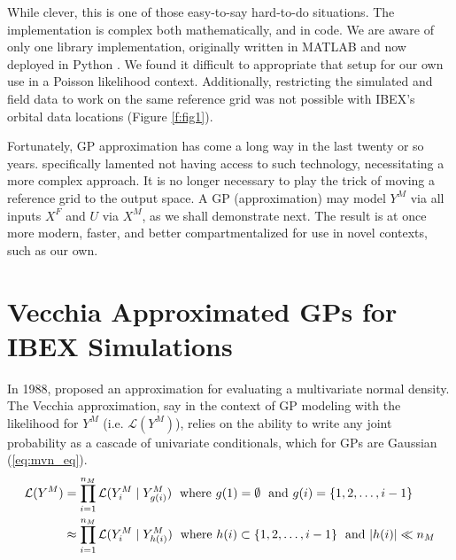 \documentclass[11pt]{article}
\begin{document}
While clever, this is one of those easy-to-say hard-to-do situations. The
implementation is complex both mathematically, and in code.  We are aware of
only one library implementation, originally written in {\sf MATLAB} and now
deployed in {\sf Python} \citep{gattiker2020lanl}.  We found it difficult to
appropriate that setup for our own use in a Poisson likelihood context.
Additionally, restricting the simulated and field data to work on the same
reference grid was not possible with IBEX's orbital data locations (Figure
\ref{f:fig1}).

Fortunately, GP approximation has come a long way in the last
twenty or so years. \citeauthor{higdoncalib2008} specifically lamented not having
access to such technology, necessitating a more complex approach. It is no
longer necessary to play the trick of moving a reference grid to the output
space.  A GP (approximation) may model $Y^M$ via all inputs $X^F$ and $U$ via
$X^M$, as we shall demonstrate next.  The result is at once more modern, faster,
and better compartmentalized for use in novel contexts, such as our own.



\section{Vecchia Approximated GPs for IBEX Simulations}
\label{sec:vecchia}

In 1988, \citeauthor{vecchia1988estimation} proposed an approximation for
evaluating a multivariate normal density. The Vecchia approximation, say in the
context of GP modeling with the likelihood for $Y^M$ (i.e. $\mathcal{L}(Y^M)$),
relies on the ability to write any joint probability as a cascade of univariate
conditionals, which for GPs are Gaussian (\ref{eq:mvn_eq}).
\begin{align}
\mathcal{L}(Y^M)&=\prod_{i=1}^{n_M} \mathcal{L}(Y^M_i \mid Y^M_{g(i)})
\hspace{0.3em} \mbox{ where } g(1)=\emptyset \hspace{0.3em} \mbox{ and }
g(i)=\{1, 2, \ldots, i-1\} \nonumber \\
&\approx \prod_{i=1}^{n_M}\mathcal{L}(Y^M_i \mid Y^M_{h(i)}) \hspace{0.3em} \mbox{
where } h(i) \subset \{1, 2, \ldots, i-1\} \hspace{0.3em} \mbox{ and } |h(i)| \ll n_M
\label{eq:vecchia}
\end{align}
\end{document}
